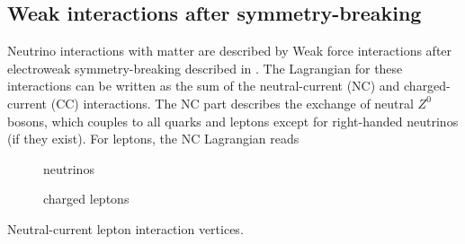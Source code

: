 \subsection{Weak interactions after symmetry-breaking}
Neutrino interactions with matter are described by Weak force interactions after electroweak symmetry-breaking described in .
The Lagrangian for these interactions can be written as the sum of the neutral-current (NC) and charged-current (CC) interactions.
The NC part describes the exchange of neutral $Z^0$ bosons, which couples to all quarks and leptons except for right-handed neutrinos (if they exist).
For leptons, the NC Lagrangian reads
\begin{marginfigure}
\centering
\begin{subfigure}[t]{0.49\linewidth}
    \caption{neutrinos}
\end{subfigure}
\begin{subfigure}[t]{0.49\linewidth}
    \caption{charged leptons}
\end{subfigure}
\caption{Neutral-current lepton interaction vertices.}
\label{fig:nc-vertices}
\end{marginfigure}

